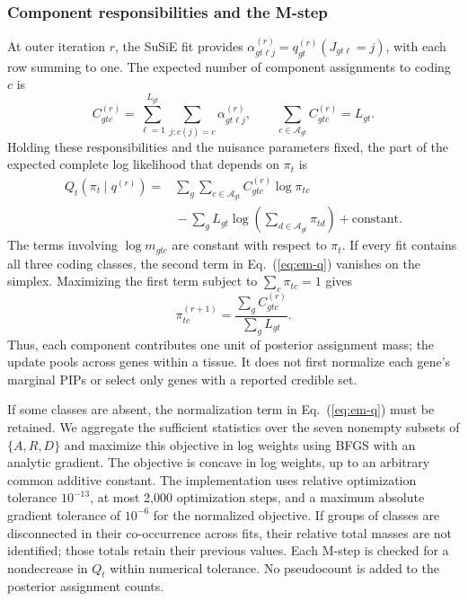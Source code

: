 \documentclass[12pt]{article}
\begin{document}
\subsubsection*{Component responsibilities and the M-step}
At outer iteration $r$, the SuSiE fit provides
$\alpha_{gt\ell j}^{(r)}=q_{gt}^{(r)}(J_{gt\ell}=j)$, with each row summing
to one. The expected number of component assignments to coding $c$ is
\begin{equation}
 C_{gtc}^{(r)}
 =\sum_{\ell=1}^{L_{gt}}\sum_{j:c(j)=c}\alpha_{gt\ell j}^{(r)},
 \qquad \sum_{c\in\mathcal{A}_{gt}}C_{gtc}^{(r)}=L_{gt}.
 \label{eq:em-counts}
\end{equation}
Holding these responsibilities and the nuisance parameters fixed, the
part of the expected complete log likelihood that depends on $\pi_t$ is
\begin{equation}
 \begin{array}{rl}
 Q_t(\pi_t\mid q^{(r)})={}&
 \displaystyle\sum_g\sum_{c\in\mathcal{A}_{gt}}
 C_{gtc}^{(r)}\log\pi_{tc}\\[6pt]
 &\displaystyle{}-\sum_g L_{gt}
 \log\left(\sum_{d\in\mathcal{A}_{gt}}\pi_{td}\right)
 +\mathrm{constant}.
 \end{array}
 \label{eq:em-q}
\end{equation}
The terms involving $\log m_{gtc}$ are constant with respect to $\pi_t$.
If every fit contains all three coding classes, the second term in
Eq.~(\ref{eq:em-q}) vanishes on the simplex. Maximizing the first term
subject to $\sum_c\pi_{tc}=1$ gives
\begin{equation}
 \pi_{tc}^{(r+1)}
 =\frac{\sum_g C_{gtc}^{(r)}}{\sum_g L_{gt}}.
 \label{eq:em-closed-update}
\end{equation}
Thus, each component contributes one unit of posterior assignment mass;
the update pools across genes within a tissue. It does not first
normalize each gene's marginal PIPs or select only genes with a reported
credible set.

If some classes are absent, the normalization term in
Eq.~(\ref{eq:em-q}) must be retained. We aggregate the sufficient statistics
over the seven nonempty subsets of $\{A,R,D\}$ and maximize this objective
in log weights using BFGS with an analytic gradient. The objective is
concave in log weights, up to an arbitrary common additive constant.
The implementation uses relative optimization tolerance $10^{-13}$,
at most 2,000 optimization steps, and a maximum absolute gradient
tolerance of $10^{-6}$ for the normalized objective. If groups of classes
are disconnected in their
co-occurrence across fits, their relative total masses are not
identified; those totals retain their previous values. Each M-step is
checked for a nondecrease in $Q_t$ within numerical tolerance. No
pseudocount is added to the posterior assignment counts.
\end{document}
